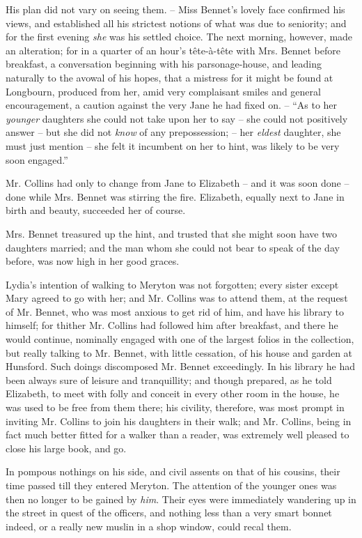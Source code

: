 His plan did not vary on seeing them. -- Miss Bennet’s
lovely face confirmed his views, and established all his
strict\-est notions of what was due to seniority; and for
the first evening \textit{she} was his settled choice. The next
morning, however, made an alteration; for in a quarter
of an hour’s tête-à-tête with Mrs. Bennet before breakfast,
a conversation beginning with his parsonage-house, and
leading naturally to the avowal of his hopes, that a mistress
for it might be found at Longbourn, produced from her,
amid very complaisant smiles and general encouragement,
a caution against the very Jane he had fixed on. -- “As
to her \textit{younger} daughters she could not take upon her to
say -- she could not positively answer -- but she did not
\textit{know} of any prepossession; -- her \textit{eldest} daughter, she must
just mention -- she felt it incumbent on her to hint, was
likely to be very soon engaged.”

Mr. Collins had only to change from Jane to Elizabeth -- and
it was soon done -- done while Mrs. Bennet was
stirring the fire. Elizabeth, equally next to Jane in birth
and beauty, succeeded her of course.

Mrs. Bennet treasured up the hint, and trusted that she
might soon have two daughters married; and the man
whom she could not bear to speak of the day before, was
now high in her good graces.

Lydia’s intention of walking to Meryton was not
forgotten; every sister except Mary agreed to go with
her; and Mr. Collins was to attend them, at the request
of Mr. Bennet, who was most anxious to get rid of him,
and have his library to himself; for thither Mr. Collins
had followed him after breakfast, and there he would
continue, nominally engaged with one of the largest folios
in the collection, but really talking to Mr. Bennet, with
little cessation, of his house and garden at Hunsford.
Such doings discomposed Mr. Bennet exceedingly. In his
library he had been always sure of leisure and tranquillity;
and though prepared, as he told Elizabeth, to meet with
folly and conceit in every other room in the house, he was
used to be free from them there; his civility, therefore,
was most prompt in inviting Mr. Collins to join his
daughters in their walk; and Mr. Collins, being in fact
much better fitted for a walker than a reader, was extremely
well pleased to close his large book, and go.

In pompous nothings on his side, and civil assents on
that of his cousins, their time passed till they entered
Meryton. The attention of the younger ones was then
no longer to be gained by \textit{him}. Their eyes were immediately
wandering up in the street in quest of the officers,
and nothing less than a very smart bonnet indeed, or
a really new muslin in a shop window, could recal them.

